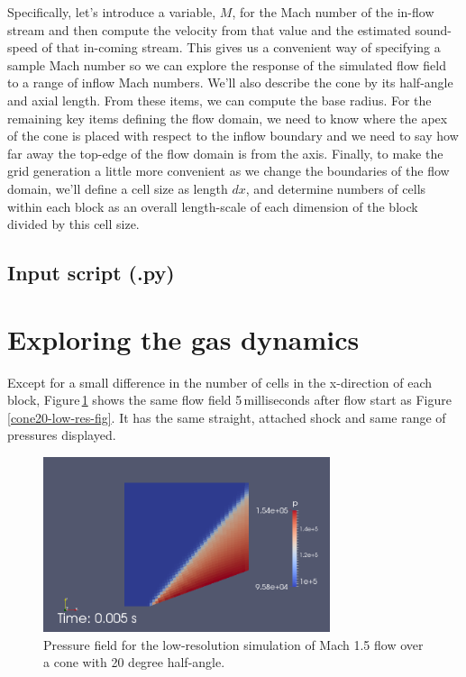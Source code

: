 \medskip
Specifically, let's introduce a variable, $M$, for the Mach number of the in-flow stream and
then compute the velocity from that value and the estimated sound-speed of that in-coming stream.
This gives us a convenient way of specifying a sample Mach number so we can explore the response 
of the simulated flow field to a range of inflow Mach numbers.
We'll also describe the cone by its half-angle and axial length.
From these items, we can compute the base radius.
For the remaining key items defining the flow domain, we need to know where the apex of the cone 
is placed with respect to the inflow boundary and we need to say how far away the top-edge 
of the flow domain is from the axis.
Finally, to make the grid generation a little more convenient as we change the boundaries 
of the flow domain, we'll define a cell size as length $dx$, and determine numbers of cells 
within each block as an overall length-scale of each dimension of the block 
divided by this cell size. 

\subsection{Input script (.py)}
%

\noindent\topbar

\bottombar
      
\section{Exploring the gas dynamics}
%
Except for a small difference in the number of cells in the x-direction of each block,
Figure\,\ref{conep-20-degrees-fig} shows the same flow field 5\,milliseconds after flow start
as Figure\,\ref{cone20-low-res-fig}.
It has the same straight, attached shock and same range of pressures displayed.

\begin{figure}[htbp]
\begin{center}
\includegraphics[width=0.75\textwidth]{../2D/cone20-parametric/conep-M1p5-20degree-p-field-5ms.png}
\end{center}
\caption{Pressure field for the low-resolution simulation 
         of Mach 1.5 flow over a cone with 20 degree half-angle.}
\label{conep-20-degrees-fig}
\end{figure}

